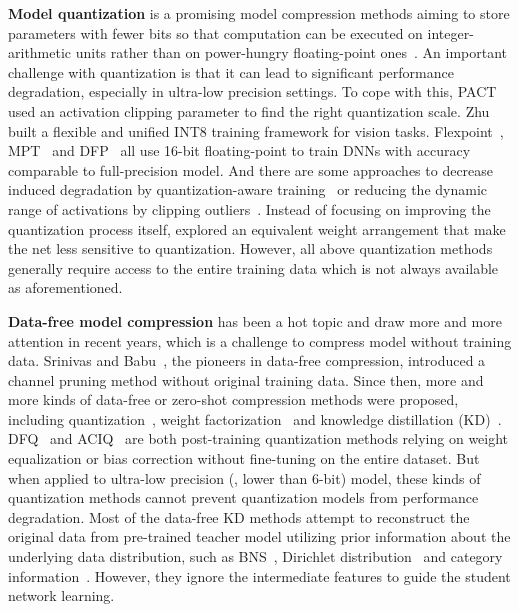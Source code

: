 \documentclass[final]{cvpr}
\begin{document}
\textbf{Model quantization} is a promising model compression methods aiming to store parameters with fewer bits so that computation can be executed on integer-arithmetic units rather than on power-hungry floating-point ones~\cite{jacob2018quantization}. An important challenge with quantization is that it can lead to significant performance degradation, especially in ultra-low precision settings. To cope with this, PACT~\cite{choi2018pact} used an activation clipping parameter to find the right quantization scale. Zhu~\etal~\cite{zhu2020towards} built a flexible and unified INT8 training framework for vision tasks. Flexpoint~\cite{koster2017flexpoint}, MPT~\cite{micikevicius2017mixed} and DFP~\cite{das2018mixed} all use 16-bit floating-point to train DNNs with accuracy comparable to full-precision model. 
And there are some approaches to decrease induced degradation by quantization-aware training~\cite{banner2018scalable,jacob2018quantization,mckinstry2018discovering} or reducing the dynamic range of activations by clipping outliers~\cite{zhao2019improving,migacz20178,banner2018aciq}. Instead of focusing on improving the quantization process itself, \cite{meller2019same} explored an equivalent weight arrangement that make the net less sensitive to quantization.
However, all above quantization methods generally require access to the entire training data which is not always available as aforementioned. 

\textbf{Data-free model compression} has been a hot topic and draw more and more attention in recent years, which is a challenge to compress model without training data. Srinivas and Babu~\cite{srinivas2015data}, the pioneers in data-free compression, introduced a channel pruning method without original training data. 
Since then, more and more kinds of data-free or zero-shot compression methods were proposed, including quantization~\cite{banner2018aciq,cai2020zeroq,xu2020generative}, weight factorization~\cite{nagel2019data} and knowledge distillation (KD)~\cite{lopes2017data,chen2019data,fang2020data,ye2020data, liu2020adaptive}. 
DFQ~\cite{nagel2019data} and ACIQ~\cite{banner2018aciq} are both post-training quantization methods relying on weight equalization or bias correction without fine-tuning on the entire dataset. But when applied to ultra-low precision (\ie, lower than 6-bit) model, these kinds of quantization methods cannot prevent quantization models from performance degradation. 
Most of the data-free KD methods attempt to reconstruct the original data from pre-trained teacher model utilizing prior information about the underlying data distribution, such as BNS~\cite{yin2020dreaming}, Dirichlet distribution~\cite{nayak2019zero} and category information~\cite{chen2019data}. However, they ignore the intermediate features to guide the student network learning. 
\end{document}
